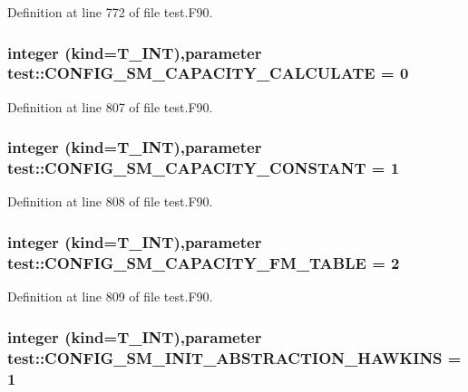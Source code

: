 Definition at line 772 of file test.F90.

\hypertarget{namespacetest_ad70f8862ac83e4d0577411e6342c88ea}{
\subsubsection[{CONFIG\_\-SM\_\-CAPACITY\_\-CALCULATE}]{\setlength{\rightskip}{0pt plus 5cm}integer (kind={\bf T\_\-INT}),parameter {\bf test::CONFIG\_\-SM\_\-CAPACITY\_\-CALCULATE} = 0}}
\label{namespacetest_ad70f8862ac83e4d0577411e6342c88ea}


Definition at line 807 of file test.F90.

\hypertarget{namespacetest_a90bf5bc96833ab6c31224335e8d67784}{
\subsubsection[{CONFIG\_\-SM\_\-CAPACITY\_\-CONSTANT}]{\setlength{\rightskip}{0pt plus 5cm}integer (kind={\bf T\_\-INT}),parameter {\bf test::CONFIG\_\-SM\_\-CAPACITY\_\-CONSTANT} = 1}}
\label{namespacetest_a90bf5bc96833ab6c31224335e8d67784}


Definition at line 808 of file test.F90.

\hypertarget{namespacetest_a6cb868053790c363d532022df302490f}{
\subsubsection[{CONFIG\_\-SM\_\-CAPACITY\_\-FM\_\-TABLE}]{\setlength{\rightskip}{0pt plus 5cm}integer (kind={\bf T\_\-INT}),parameter {\bf test::CONFIG\_\-SM\_\-CAPACITY\_\-FM\_\-TABLE} = 2}}
\label{namespacetest_a6cb868053790c363d532022df302490f}


Definition at line 809 of file test.F90.

\hypertarget{namespacetest_ad42c9ade45d8d8085a2fd417fe22878a}{
\subsubsection[{CONFIG\_\-SM\_\-INIT\_\-ABSTRACTION\_\-HAWKINS}]{\setlength{\rightskip}{0pt plus 5cm}integer (kind={\bf T\_\-INT}),parameter {\bf test::CONFIG\_\-SM\_\-INIT\_\-ABSTRACTION\_\-HAWKINS} = 1}}
\label{namespacetest_ad42c9ade45d8d8085a2fd417fe22878a}


